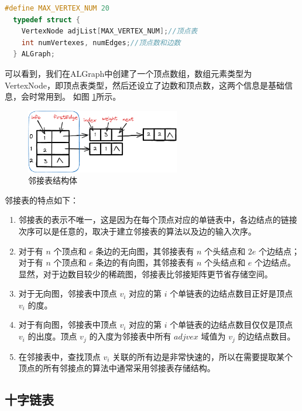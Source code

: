 \documentclass[lang=cn,newtx,10pt,scheme=chinese]{../elegantbook}
\begin{document}
\begin{lstlisting}[language=C++, caption={邻接表结构体}]
  #define MAX_VERTEX_NUM 20
  typedef struct {
    VertexNode adjList[MAX_VERTEX_NUM];//顶点表
    int numVertexes, numEdges;//顶点数和边数
  } ALGraph;
\end{lstlisting}

可以看到，我们在ALGraph中创建了一个顶点数组，数组元素类型为VertexNode，即顶点表类型，然后还设立了边数和顶点数，这两个信息是基础信息，会时常用到。
如图 \ref{fig:adjacencyList_struct3}所示。

\begin{figure}[!htbp]
  \centering
  \includegraphics[width=0.6\textwidth]{./figure/pdf/cropped/adjList_array.pdf}
  \caption{邻接表结构体}
  \label{fig:adjacencyList_struct3}
\end{figure}

邻接表的特点如下：

\begin{enumerate}
  \item 邻接表的表示不唯一，这是因为在每个顶点对应的单链表中，各边结点的链接次序可以是任意的，取决于建立邻接表的算法以及边的输入次序。
  
  \item 对于有 $n$ 个顶点和 $e$ 条边的无向图，其邻接表有 $n$ 个头结点和 $2e$ 个边结点；对于有 $n$ 个顶点和 $e$ 条边的有向图，其邻接表有 $n$ 个头结点和 $e$ 个边结点。显然，对于边数目较少的稀疏图，邻接表比邻接矩阵更节省存储空间。
  
  \item 对于无向图，邻接表中顶点 $v_i$ 对应的第 $i$ 个单链表的边结点数目正好是顶点 $v_i$ 的度。
  
  \item 对于有向图，邻接表中顶点 $v_i$ 对应的第 $i$ 个单链表的边结点数目仅仅是顶点 $v_i$ 的出度。顶点 $v_j$ 的入度为邻接表中所有 $adjvex$ 域值为 $v_j$ 的边结点数目。
  
  \item 在邻接表中，查找顶点 $v_i$ 关联的所有边是非常快速的，所以在需要提取某个顶点的所有邻接点的算法中通常采用邻接表存储结构。
\end{enumerate}
\subsection{十字链表}
\end{document}
